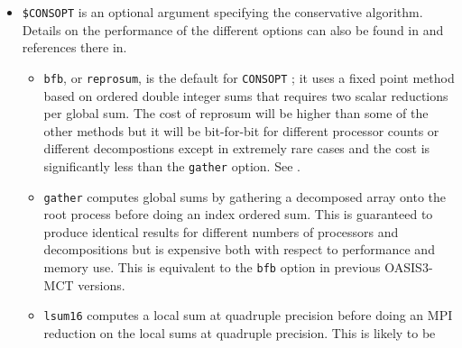 \begin{itemize}
\begin{itemize}
\begin{itemize}
      {\tt GLBPOS} except that the non-masked surface of the
      source and the target grids are taken into account and the
      residual is distributed proportionally to the value of the
      original field; this option does not ensure global
      conservation of the field but ensures that the energy received
      is proportional to the non-masked surface of the target grid and
      it does not change the sign of the field if the field is well behaved.
    \item with {\tt  BSSPOS}, the same operation as {\tt BASPOS} is performed
      except that the multiplicative term is computed separately for positive
      and negative values of the field; this option has the same characteristics
      as {\tt BASPOS} except that it does not change the sign of the field, but is
      more expensive because many extra global sums are required; 
      this should be used in cases where the area averaged field value tends to 0
      as these cases can generate poor corrections, even leading
      to changes of sign, when carried out with the {\tt BASPOS} option.
    \end{itemize}
  \item {\tt \$CONSOPT} is an optional argument specifying the conservative
    algorithm. Details on the performance of the different options can also be found in \cite{craig17} and references there in.
\begin{itemize}
\item {\tt bfb}, or {\tt reprosum}, is the default for {\tt CONSOPT} ; it uses a fixed point method based on ordered double integer sums
  that requires two scalar reductions per global sum.  The cost of reprosum will be higher than
  some of the other methods but it will be bit-for-bit for different processor counts or
  different decompostions except in extremely rare cases and the cost is significantly less
  than the {\tt gather} option. See \cite{Mirin2012}. 
\item {\tt gather} computes global sums by gathering a decomposed array
  onto the root process before doing an index ordered sum.  This is guaranteed to produce
  identical results for different numbers of processors and decompositions but is expensive
  both with respect to performance and memory use. This is equivalent to the {\tt bfb} option in previous OASIS3-MCT versions.
\item  {\tt lsum16} computes a local sum at quadruple precision before doing
  an MPI reduction on the local sums at quadruple precision.  This is likely to be

\end{itemize}
\end{itemize}
\end{itemize}
